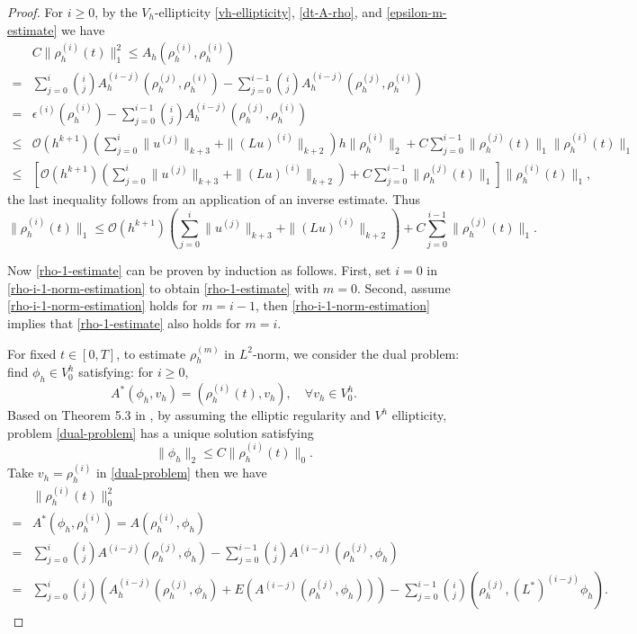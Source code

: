 \documentclass[onefignum,onetabnum]{siamart171218}
\begin{document}
\begin{proof}
For $i\geq 0$, by the $V_h$-ellipticity \eqref{vh-ellipticity}, \eqref{dt-A-rho}, and \eqref{epsilon-m-estimate} we have 
\[\begin{aligned}
& C\|\rho_h^{(i)}( t)\|_1^2 \leq A_h( \rho^{(i)}_h, \rho^{(i)}_h)\\
= & \sum_{j=0}^i {i\choose j} A_h^{(i-j)}( \rho^{(j)}_h, \rho^{(i)}_h) - \sum_{j=0}^{i-1} {i\choose j} A_h^{(i-j)}( \rho^{(j)}_h, \rho^{(i)}_h)\\
= & \epsilon^{(i)}(\rho^{(i)}_h) - \sum_{j=0}^{i-1} {i\choose j} A_h^{(i-j)}( \rho^{(j)}_h, \rho^{(i)}_h) \\
\leq & \mathcal O(h^{k+1})\left( \sum_{j=0}^i \|u^{(j)}\|_{k+3}+\|(Lu)^{(i)}\|_{k+2} \right)h\|\rho^{(i)}_h\|_2 +C\sum_{j=0}^{i-1}\|\rho^{(j)}_h( t)\|_{1}\|\rho^{(i)}_h( t)\|_{1}\\
\leq & \left[ \mathcal O(h^{k+1})\left(\sum_{j=0}^i\|u^{(j)}\|_{k+3}+\|(Lu)^{(i)}\|_{k+2}\right)+C\sum_{j=0}^{i-1}\|\rho^{(j)}_h( t)\|_{1}\right]\|\rho^{(i)}_h( t)\|_1,
\end{aligned}\]
 the last inequality follows from an application of an inverse estimate. Thus
\begin{equation}
\label{rho-i-1-norm-estimation}
\|\rho_h^{(i)}( t)\|_1\leq \mathcal O(h^{k+1})\left(\sum_{j=0}^i\|u^{(j)}\|_{k+3}+\|(Lu)^{(i)}\|_{k+2}\right)+C\sum_{j=0}^{i-1}\|\rho^{(j)}_h( t)\|_{1}.
\end{equation}

Now \eqref{rho-1-estimate} can be proven by induction as follows. First, set $i=0$ in  \eqref{rho-i-1-norm-estimation}  to obtain  \eqref{rho-1-estimate} with $m=0$. 
Second, assume   \eqref{rho-i-1-norm-estimation}  holds for $m=i-1$, then  \eqref{rho-i-1-norm-estimation} implies  that \eqref{rho-1-estimate} also holds for $m=i$.
 
For fixed $t\in[0,T]$, to estimate $\rho_h^{(m)}$ in $L^2$-norm, we consider the dual problem: find $\phi_h\in V^h_0$ satisfying: for $i\geq 0$,
\begin{equation}\label{dual-problem}
A^*(\phi_h, v_h)=( \rho^{(i)}_h(t), v_h), \quad \forall v_h \in V^h_0.
\end{equation}
Based on Theorem 5.3 in \cite{li2020superconvergence}, by assuming the elliptic regularity and $V^h$ ellipticity, problem \eqref{dual-problem} has a unique solution satisfying
\begin{equation}\label{dual-elliptic-regularity}
\|\phi_h\|_2 \leq C \|\rho_h^{(i)}(t)\|_{0}.
\end{equation}
Take $v_h = \rho^{(i)}_h$ in \eqref{dual-problem} then we have 
\begin{align*}
& \|\rho^{(i)}_h( t)\|_0^2\\
= & A^*(\phi_h, \rho^{(i)}_h) = A(\rho^{(i)}_h, \phi_h)\\
= & \sum_{j=0}^i {i\choose j} A^{(i-j)}( \rho^{(j)}_h, \phi_h) - \sum_{j=0}^{i-1} {i\choose j} A^{(i-j)}( \rho^{(j)}_h, \phi_h) \\
= & \sum_{j=0}^i {i\choose j} \left(A_h^{(i-j)}(\rho^{(j)}_h, \phi_h) +E\left(A^{(i-j)}( \rho^{(j)}_h, \phi_h)\right)\right) - \sum_{j=0}^{i-1} {i\choose j} \left(\rho^{(j)}_h, (L^*)^{(i-j)}\phi_h \right).
\end{align*}


\end{proof}
\end{document}
